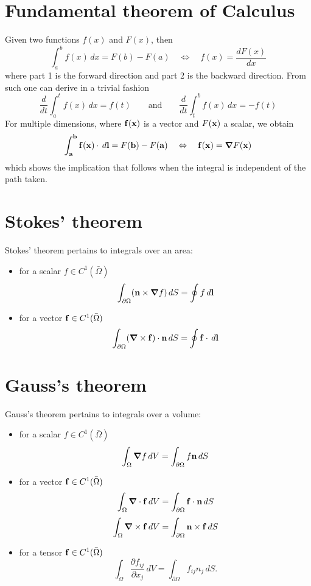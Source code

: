 \documentclass[oneside,a4paper,11pt]{report}
\begin{document}
\section{Fundamental theorem of Calculus}
Given two functions $f(x)$ and $F(x)$, then
\[ \int_a^b f(x) \,dx = F(b) - F(a) \quad \Leftrightarrow \quad f(x) = \frac{dF(x)}{dx} \]
where part 1 is the forward direction and part 2 is the backward direction. From such one can derive in a trivial fashion 
\[ \frac{d}{dt} \int_a^t f(x) \,dx = f(t) \qquad \text{and} \qquad \frac{d}{dt}\int_t^b f(x) \,dx = - f(t) \]
For multiple dimensions, where $\mathbf{f}(\mathbf{x})$ is a vector and $F(\mathbf{x})$ a scalar, we obtain
\[ \int_{\mathbf{a}}^{\mathbf{b}} \mathbf{f}(\mathbf{x}) \cdot \, d\mathbf{l} = F(\mathbf{b}) - F(\mathbf{a}) \quad \Leftrightarrow \quad \mathbf{f}(\mathbf{x}) = \bm \nabla F(\mathbf{x}) \]
which shows the implication that follows when the integral is independent of the path taken.

\section{Stokes' theorem}
Stokes' theorem pertains to integrals over an area:
\begin{itemize}
\item for a scalar $f \in C^1 (\bar{\Omega})$
\[\int_{\partial \Omega} (\mathbf{n} \times \bm \nabla f)\,dS = \oint f \, d\mathbf{l} \]
\item for a vector $\mathbf{f} \in C^1 (\bar{\Omega})$
\[\int_{\partial \Omega} (\bm \nabla \times \mathbf{f}) \cdot \mathbf{n} \,dS = \oint \mathbf{f} \cdot \, d\mathbf{l} \]
\end{itemize}

\section{Gauss's theorem}
Gauss's theorem pertains to integrals over a volume:
\begin{itemize}
\item for a scalar $f \in C^1 (\bar{\Omega})$
\[\int_{\Omega} \bm \nabla f\,dV=\int_{\partial \Omega} f \mathbf{n} \,dS\] 
\item for a vector $\mathbf{f} \in C^1 (\bar{\Omega})$
\[\int_{\Omega} \bm \nabla \cdot \mathbf{f} \,dV=\int_{\partial \Omega} \mathbf{f} \cdot \mathbf{n} \,dS \] 
\[\int_{\Omega} \bm \nabla \times \mathbf{f}\,dV=\int_{\partial \Omega} \mathbf{n} \times \mathbf{f} \,dS \]
\item for a tensor $\mathbf{f} \in C^1 (\bar{\Omega})$
\[\int_{\Omega} \frac{\partial f_{ij}}{\partial x_j}\,dV=\int_{\partial \Omega} f_{ij}n_j\,dS. \]
\end{itemize}
\end{document}
